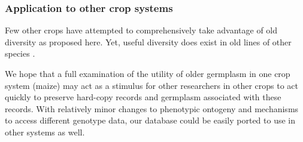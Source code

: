 \documentclass[12pt]{article}
\begin{document}
\subsubsection*{Application to other crop systems}
Few other crops have attempted to comprehensively take advantage of old diversity as proposed here.  
Yet, useful diversity does exist in old lines of other species \citep{gamuyao2012protein}. 

We hope that a full examination of the utility of older germplasm in one crop system (maize) may act as a stimulus for other researchers in other crops to act quickly to preserve hard-copy records and germplasm associated with these records. 
With relatively minor changes to phenotypic ontogeny and mechanisms to access different genotype data, our database could be easily ported to use in other systems as well. 

\newpage

\end{document}
